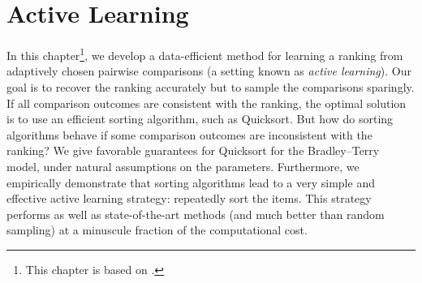 \chapter{Active Learning}
\label{ch:robustsort}

In this chapter\footnote{%
This chapter is based on \citet{maystre2017just}.},
we develop a data-efficient method for learning a ranking from adaptively chosen pairwise comparisons (a setting known as \emph{active learning}).
Our goal is to recover the ranking accurately but to sample the comparisons sparingly.
If all comparison outcomes are consistent with the ranking, the optimal solution is to use an efficient sorting algorithm, such as Quicksort.
But how do sorting algorithms behave if some comparison outcomes are inconsistent with the ranking?
We give favorable guarantees for Quicksort for the Bradley--Terry model, under natural assumptions on the parameters.
Furthermore, we empirically demonstrate that sorting algorithms lead to a very simple and effective active learning strategy: repeatedly sort the items.
This strategy performs as well as state-of-the-art methods (and much better than random sampling) at a minuscule fraction of the computational cost.







